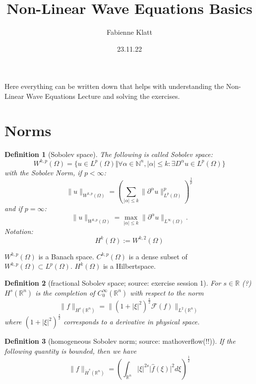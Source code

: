 \documentclass[12pt,a4paper]{article}
\title{Non-Linear Wave Equations Basics}
\author{Fabienne Klatt}
\date{23.11.22}
\newtheorem{definition}{Definition}
\newcommand{\Rn}{\mathbb{R}^n}
\begin{document}
\tableofcontents
\thispagestyle{empty}

\clearpage

Here everything can be written down that helps with understanding the Non-Linear Wave Equations Lecture and solving the exercises.

\section{Norms}

\begin{definition}[Sobolev space]
The following is called Sobolev space:
\begin{equation}
W^{k,p}(\Omega)=\{u\in L^p(\Omega)\Vert \forall\alpha\in\mathbb{N}^n, \vert\alpha\vert\leq k:\exists D^{\alpha}u\in L^p(\Omega)\}
\end{equation}
with the Sobolev Norm, if $p<\infty$:
\begin{equation}
\lVert u\rVert_{W^{k,p}(\Omega)}=(\sum_{\vert\alpha\vert\leq k} \lVert \partial^{\alpha}u\rVert^p_{L^p(\Omega)})^{\frac{1}{p}}
\end{equation}
and if $p=\infty$:
\begin{equation}
\lVert u\rVert_{W^{k,p}(\Omega)}= \max_{\vert\alpha\vert\leq k} \lVert \partial^{\alpha}u\rVert_{L^{\infty}(\Omega)}.
\end{equation}
Notation: 
\begin{equation}
H^k(\Omega):=W^{k,2}(\Omega)
\end{equation}
\end{definition}

$W^{k,p}(\Omega)$ is a Banach space.
$C^{k,p}(\Omega)$ is a dense subset of $W^{k,p}(\Omega)\subset L^p(\Omega)$. $H^k(\Omega)$ is a Hilbertspace.

\begin{definition}[fractional Sobolev space; source: exercise session 1]
For $s\in\mathbb{R}$ (?) $H^s(\mathbb{R}^n)$ is the completion of $C^{\infty}_0(\mathbb{R}^n)$ with respect to the norm
\begin{equation}
\lVert f \rVert_{H^s(\mathbb{R}^n)}=\lVert (1+\lvert\xi\rvert^2)^{\frac{s}{2}}\mathcal{F}(f)\rVert_{L^2(\mathbb{R}^n)}
\end{equation}
where $(1+\lvert\xi\rvert^2)^{\frac{s}{2}}$ corresponds to a derivative in physical space.
\end{definition}

\begin{definition}[homogeneous Sobolev norm; source: mathoverflow(!!)]
If the following quantity is bounded, then we have
\begin{equation}
\lVert f \rVert_{\dot H^s(\Rn)}=(\int_{\Rn} \vert \xi\vert^{2s} \vert \hat{f}(\xi)\vert^2 d\xi)^{\frac{1}{2}}
\end{equation}
\end{definition}
\end{document}

